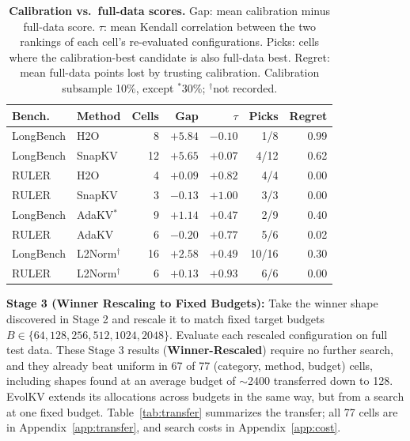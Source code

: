 \documentclass[11pt]{article}
\begin{document}
\begin{table}[htbp]
  \centering
  \footnotesize
  \setlength{\tabcolsep}{2.5pt}
  \begin{tabular}{@{} l l r r r r r @{}}
    \toprule
    \textbf{Bench.} & \textbf{Method} & \textbf{Cells} & \textbf{Gap} & \textbf{$\tau$} & \textbf{Picks} & \textbf{Regret} \\
    \midrule
    \rowcolor{gray!10}
    LongBench & H2O    & 8  & $+5.84$ & $-0.10$ & 1/8  & 0.99 \\
    LongBench & SnapKV & 12 & $+5.65$ & $+0.07$ & 4/12 & 0.62 \\
    \rowcolor{gray!10}
    RULER     & H2O    & 4  & $+0.09$ & $+0.82$ & 4/4  & 0.00 \\
    RULER     & SnapKV & 3  & $-0.13$ & $+1.00$ & 3/3  & 0.00 \\
    \midrule
    \rowcolor{gray!10}
    LongBench & AdaKV$^\ast$ & 9 & $+1.14$ & $+0.47$ & 2/9 & 0.40 \\
    RULER     & AdaKV  & 6  & $-0.20$ & $+0.77$ & 5/6  & 0.02 \\
    \midrule
    \rowcolor{gray!10}
    LongBench & L2Norm$^\dagger$ & 16 & $+2.58$ & $+0.49$ & 10/16 & 0.30 \\
    RULER     & L2Norm$^\dagger$ & 6  & $+0.13$ & $+0.93$ & 6/6   & 0.00 \\
    \bottomrule
  \end{tabular}
  \caption{\textbf{Calibration vs.\ full-data scores.} Gap: mean calibration minus full-data score. $\tau$: mean Kendall correlation between the two rankings of each cell's re-evaluated configurations. Picks: cells where the calibration-best candidate is also full-data best. Regret: mean full-data points lost by trusting calibration. Calibration subsample 10\%, except $^\ast$30\%; $^\dagger$not recorded.}
  \label{tab:calib}
\end{table}

\textbf{Stage 3 (Winner Rescaling to Fixed Budgets):} Take the winner shape discovered in Stage 2 and rescale it to match fixed target budgets $B \in \{64, 128, 256, 512, 1024, 2048\}$. Evaluate each rescaled configuration on full test data. These Stage 3 results (\textbf{Winner-Rescaled}) require no further search, and they already beat uniform in 67 of 77 (category, method, budget) cells, including shapes found at an average budget of $\sim$2400 transferred down to 128. EvolKV extends its allocations across budgets in the same way, but from a search at one fixed budget. Table~\ref{tab:transfer} summarizes the transfer; all 77 cells are in Appendix~\ref{app:transfer}, and search costs in Appendix~\ref{app:cost}.
\end{document}
